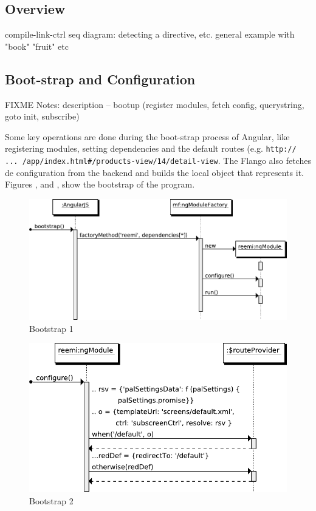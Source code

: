 \subsection{Overview}
compile-link-ctrl
seq diagram: detecting a directive, etc. general example with "book" "fruit" etc

\subsection{Boot-strap and Configuration}
FIXME Notes: description -- bootup (register modules, fetch config, querystring, goto init, subscribe)

Some key operations are done during the boot-strap process of Angular, like registering modules, setting dependencies and the default routes (e.g. \texttt{http:// ... /app/index.html\#/products-view/14/detail-view}.
The Flango \cm also fetches de configuration from the backend and builds the local object that represents it.
Figures ,  and , show the bootstrap of the program.

\begin{figure}[htb]
    \centering
    \includegraphics{figures/design/seqdia/bootstrap-1.pdf}
    \caption{Bootstrap 1}
    \label{fig:design-seqdia-bootstrap-1}
\end{figure}

\begin{figure}[htb]
    \centering
    \includegraphics{figures/design/seqdia/bootstrap-2.pdf}
    \caption{Bootstrap 2}
    \label{fig:design-seqdia-bootstrap-2}
\end{figure}

